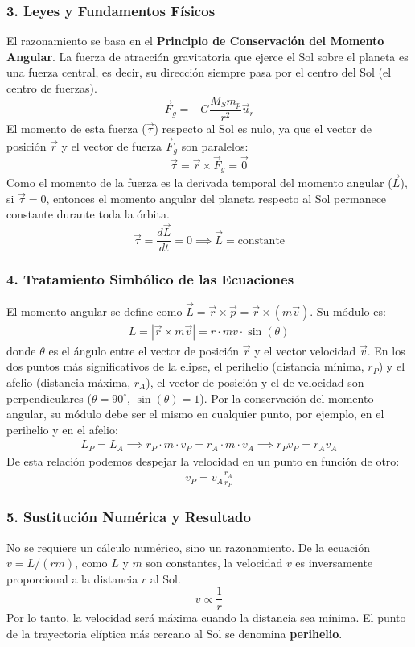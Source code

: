 \subsubsection*{3. Leyes y Fundamentos Físicos}
El razonamiento se basa en el \textbf{Principio de Conservación del Momento Angular}. La fuerza de atracción gravitatoria que ejerce el Sol sobre el planeta es una fuerza central, es decir, su dirección siempre pasa por el centro del Sol (el centro de fuerzas).
$$ \vec{F}_g = -G\frac{M_S m_p}{r^2}\vec{u}_r $$
El momento de esta fuerza ($\vec{\tau}$) respecto al Sol es nulo, ya que el vector de posición $\vec{r}$ y el vector de fuerza $\vec{F}_g$ son paralelos:
$$ \vec{\tau} = \vec{r} \times \vec{F}_g = \vec{0} $$
Como el momento de la fuerza es la derivada temporal del momento angular ($\vec{L}$), si $\vec{\tau}=0$, entonces el momento angular del planeta respecto al Sol permanece constante durante toda la órbita.
$$ \vec{\tau} = \frac{d\vec{L}}{dt} = 0 \implies \vec{L} = \text{constante} $$

\subsubsection*{4. Tratamiento Simbólico de las Ecuaciones}
El momento angular se define como $\vec{L} = \vec{r} \times \vec{p} = \vec{r} \times (m\vec{v})$. Su módulo es:
\begin{gather}
    L = |\vec{r} \times m\vec{v}| = r \cdot mv \cdot \sin(\theta)
\end{gather}
donde $\theta$ es el ángulo entre el vector de posición $\vec{r}$ y el vector velocidad $\vec{v}$. En los dos puntos más significativos de la elipse, el perihelio (distancia mínima, $r_P$) y el afelio (distancia máxima, $r_A$), el vector de posición y el de velocidad son perpendiculares ($\theta=90^\circ$, $\sin(\theta)=1$).
Por la conservación del momento angular, su módulo debe ser el mismo en cualquier punto, por ejemplo, en el perihelio y en el afelio:
\begin{gather}
    L_P = L_A \implies r_P \cdot m \cdot v_P = r_A \cdot m \cdot v_A \implies r_P v_P = r_A v_A
\end{gather}
De esta relación podemos despejar la velocidad en un punto en función de otro:
\begin{gather}
    v_P = v_A \frac{r_A}{r_P}
\end{gather}

\subsubsection*{5. Sustitución Numérica y Resultado}
No se requiere un cálculo numérico, sino un razonamiento. De la ecuación $v = L/(rm)$, como $L$ y $m$ son constantes, la velocidad $v$ es inversamente proporcional a la distancia $r$ al Sol.
$$ v \propto \frac{1}{r} $$
Por lo tanto, la velocidad será máxima cuando la distancia sea mínima. El punto de la trayectoria elíptica más cercano al Sol se denomina \textbf{perihelio}.

